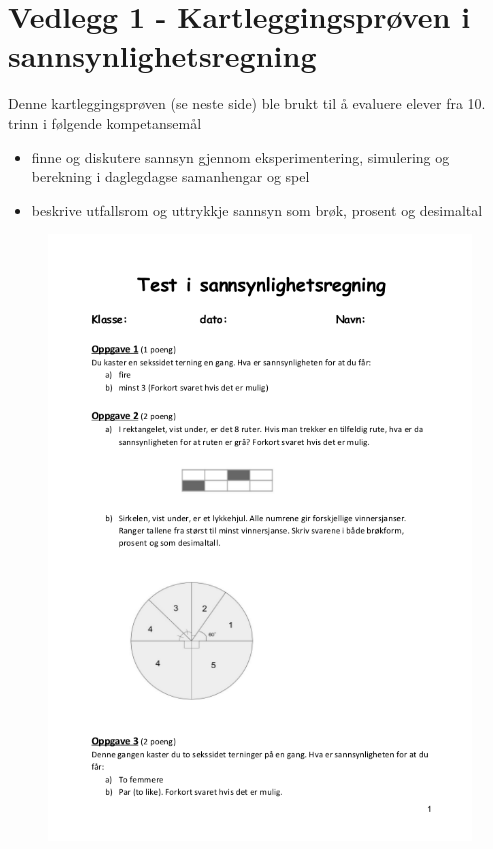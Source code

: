 \documentclass[main.tex]{subfiles}
\begin{document}
\appendix
\section*{Vedlegg 1 - Kartleggingsprøven i sannsynlighetsregning}

Denne kartleggingsprøven (se neste side) ble brukt til å evaluere elever fra 10. trinn
i følgende kompetansemål 
\begin{itemize}
\item finne og diskutere sannsyn gjennom eksperimentering, simulering og berekning i daglegdagse samanhengar og spel
\item beskrive utfallsrom og uttrykkje sannsyn som brøk, prosent og desimaltal
\end{itemize}
\begin{figure}[h!]
  \centering
  \includegraphics[width=.9\linewidth]{../figures/test1.png}
\end{figure}
\end{document}
